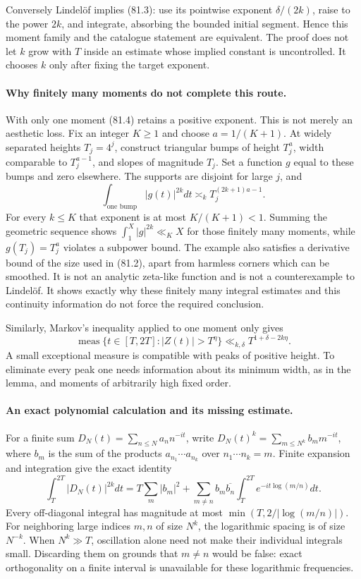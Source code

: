 \documentclass[11pt]{article}
\begin{document}
Conversely Lindelöf implies (81.3): use its pointwise exponent
$\delta/(2k)$, raise to the power $2k$, and integrate, absorbing the
bounded initial segment. Hence this moment family and the catalogue
statement are equivalent. The proof does not let $k$ grow with $T$ inside
an estimate whose implied constant is uncontrolled. It chooses $k$ only
after fixing the target exponent.

\paragraph{Why finitely many moments do not complete this route.}
With only one moment (81.4) retains a positive exponent. This is not
merely an aesthetic loss. Fix an integer $K\geq1$ and choose
$a=1/(K+1)$. At widely separated heights $T_j=4^j$, construct triangular
bumps of height $T_j^a$, width comparable to $T_j^{a-1}$, and slopes of
magnitude $T_j$. Set a function $g$ equal to these bumps and zero elsewhere.
The supports are disjoint for large $j$, and
\[
 \int_{\text{one bump}}|g(t)|^{2k}dt
       \asymp_k T_j^{(2k+1)a-1}.
\]
For every $k\leq K$ that exponent is at most $K/(K+1)<1$.
Summing the geometric sequence shows $\int_1^X|g|^{2k}\ll_K X$
for those finitely many moments, while $g(T_j)=T_j^a$ violates a
subpower bound. The example also satisfies a derivative bound of the
size used in (81.2), apart from harmless corners which can be smoothed.
It is not an analytic zeta-like function and is not a counterexample to
Lindelöf. It shows exactly why these finitely many integral estimates
and this continuity information do not force the required conclusion.

Similarly, Markov's inequality applied to one moment only gives
\[
 \operatorname{meas}\{t\in[T,2T]:|Z(t)|>T^\eta\}
       \ll_{k,\delta}T^{1+\delta-2k\eta}.                \tag{81.5}
\]
A small exceptional measure is compatible with peaks of positive height.
To eliminate every peak one needs information about its minimum width,
as in the lemma, and moments of arbitrarily high fixed order.

\paragraph{An exact polynomial calculation and its missing estimate.}
For a finite sum $D_N(t)=\sum_{n\leq N}a_n n^{-it}$, write
$D_N(t)^k=\sum_{m\leq N^k}b_m m^{-it}$, where $b_m$ is the sum of the
products $a_{n_1}\cdots a_{n_k}$ over $n_1\cdots n_k=m$.
Finite expansion and integration give the exact identity
\[
 \int_T^{2T}|D_N(t)|^{2k}dt
 =T\sum_m|b_m|^2+
 \sum_{m\ne n}b_m\overline{b_n}
       \int_T^{2T}e^{-it\log(m/n)}dt.                   \tag{81.6}
\]
Every off-diagonal integral has magnitude at most
$\min(T,2/|\log(m/n)|)$. For neighboring large indices $m,n$ of size
$N^k$, the logarithmic spacing is of size $N^{-k}$. When $N^k\gg T$,
oscillation alone need not make their individual integrals small. Discarding
them on grounds that $m\ne n$ would be false: exact orthogonality on a
finite interval is unavailable for these logarithmic frequencies.
\end{document}
